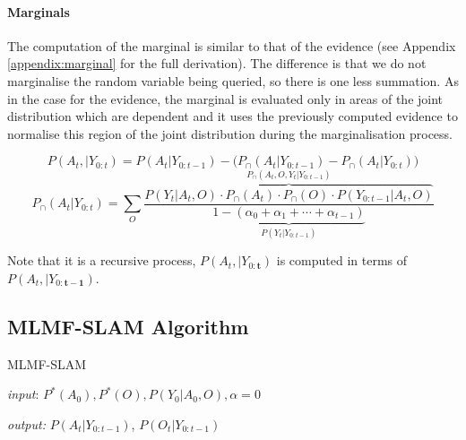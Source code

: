 \paragraph{Marginals}

The computation of the marginal is similar to that of the evidence (see Appendix \ref{appendix:marginal} for the full derivation). 
The difference is that we do not marginalise the random variable being queried, so there is one less summation. 
As in the case for the evidence, the marginal is evaluated only in areas of the joint distribution which are dependent 
and it uses the previously computed evidence to normalise this region of the joint distribution during the marginalisation 
process.

\begin{equation}
 P(A_t,|Y_{0:t})  =  P(A_t|Y_{0:t-1}) - \Big(P_{\cap}(A_t|Y_{0:t-1}) -  P_{\cap}(A_t|Y_{0:t})  \Big) \label{eq:marignal_mrf} 
\end{equation}
\begin{equation}\label{eq:marignal_mrf_2}
 P_{\cap}(A_t|Y_{0:t}) = \sum\limits_{O} \frac{\overbrace{P(Y_t|A_t,O) \cdot P_{\cap}(A_t)\cdot P_{\cap}(O) \cdot P(Y_{0:t-1}|A_t,O)}^{P_{\cap}(A_t,O,Y_t|Y_{0:t-1})}}{\underbrace{1  - (\alpha_{0} + \alpha_{1} + \cdots + \alpha_{t-1})}_{P(Y_t|Y_{0:t-1})}}
\end{equation}

Note that it is a recursive process, $P(A_t,|Y_{0:\mathbf{t}})$ is computed in terms of  $P(A_t,|Y_{0:\mathbf{t-1}})$.

\subsection{MLMF-SLAM Algorithm}

\begin{algorithm}
\caption{MLMF-SLAM}
\textit{input}: $P^{*}(A_0), P^{*}(O), P(Y_0|A_0,O), \alpha=0$
 \begin{algorithmic}[1]
    
    
    
\end{algorithmic} \label{alg:mrf-slam}
\textit{output:} $P(A_t|Y_{0:t-1})$, $P(O_t|Y_{0:t-1})$ 
\end{algorithm}

